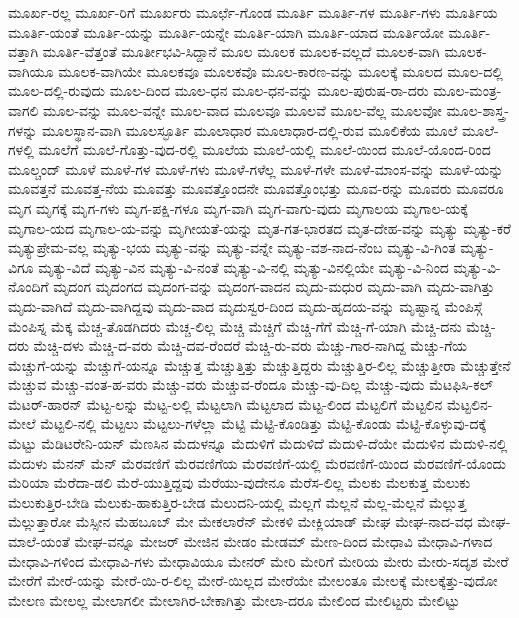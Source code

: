 {ಮೂರ್ಖ-ರಲ್ಲ
ಮೂರ್ಖ-ರಿಗೆ
ಮೂರ್ಖರು
ಮೂರ್ಛೆ-ಗೊಂಡ
ಮೂರ್ತಿ
ಮೂರ್ತಿ-ಗಳ
ಮೂರ್ತಿ-ಗಳು
ಮೂರ್ತಿಯ
ಮೂರ್ತಿ-ಯಂತೆ
ಮೂರ್ತಿ-ಯನ್ನು
ಮೂರ್ತಿ-ಯನ್ನೇ
ಮೂರ್ತಿ-ಯಾಗಿ
ಮೂರ್ತಿ-ಯಾದ
ಮೂರ್ತಿಯೋ
ಮೂರ್ತಿ-ವತ್ತಾಗಿ
ಮೂರ್ತಿ-ವೆತ್ತಂತೆ
ಮೂರ್ತೀಭವಿ-ಸಿದ್ದಾನೆ
ಮೂಲ
ಮೂಲಕ
ಮೂಲಕ-ವಲ್ಲದೆ
ಮೂಲಕ-ವಾಗಿ
ಮೂಲಕ-ವಾಗಿಯೂ
ಮೂಲಕ-ವಾಗಿಯೇ
ಮೂಲಕವೂ
ಮೂಲಕವೊ
ಮೂಲ-ಕಾರಣ-ವನ್ನು
ಮೂಲಕ್ಕೆ
ಮೂಲದ
ಮೂಲ-ದಲ್ಲಿ
ಮೂಲ-ದಲ್ಲಿ-ರುವುದು
ಮೂಲ-ದಿಂದ
ಮೂಲ-ಧನ
ಮೂಲ-ಧನ-ವನ್ನು
ಮೂಲ-ಪುರುಷ-ರಾ-ದರು
ಮೂಲ-ಮಂತ್ರ-ವಾಗಲಿ
ಮೂಲ-ವನ್ನು
ಮೂಲ-ವನ್ನೇ
ಮೂಲ-ವಾದ
ಮೂಲವೂ
ಮೂಲವೆ
ಮೂಲ-ವೆಲ್ಲ
ಮೂಲವೋ
ಮೂಲ-ಶಾಸ್ತ್ರ-ಗಳನ್ನು
ಮೂಲಸ್ಥಾನ-ವಾಗಿ
ಮೂಲಸ್ಫೂರ್ತಿ
ಮೂಲಾಧಾರ
ಮೂಲಾಧಾರ-ದಲ್ಲಿ-ರುವ
ಮೂಲಿಕೆಯ
ಮೂಲೆ
ಮೂಲೆ-ಗಳಲ್ಲಿ
ಮೂಲೆಗೆ
ಮೂಲೆ-ಗೊತ್ತು-ವುದ-ರಲ್ಲಿ
ಮೂಲೆಯ
ಮೂಲೆ-ಯಲ್ಲಿ
ಮೂಲೆ-ಯಿಂದ
ಮೂಲೆ-ಯೊಂದ-ರಿಂದ
ಮೂಲ್ಚಂದ್
ಮೂಳೆ
ಮೂಳೆ-ಗಳ
ಮೂಳೆ-ಗಳು
ಮೂಳೆ-ಗಳೆಲ್ಲ
ಮೂಳೆ-ಗಳೇ
ಮೂಳೆ-ಮಾಂಸ-ವನ್ನು
ಮೂಳೆ-ಯನ್ನು
ಮೂವತ್ತನೆ
ಮೂವತ್ತ-ನೆಯ
ಮೂವತ್ತು
ಮೂವತ್ತೊಂದನೇ
ಮೂವತ್ತೊಂಭತ್ತು
ಮೂವ-ರನ್ನು
ಮೂವರು
ಮೂವರೂ
ಮೃಗ
ಮೃಗಕ್ಕೆ
ಮೃಗ-ಗಳು
ಮೃಗ-ಪಕ್ಷಿ-ಗಳೂ
ಮೃಗ-ವಾಗಿ
ಮೃಗ-ವಾಗು-ವುದು
ಮೃಗಾಲಯ
ಮೃಗಾಲ-ಯಕ್ಕೆ
ಮೃಗಾಲ-ಯದ
ಮೃಗಾಲ-ಯ-ವನ್ನು
ಮೃಗೀಯತೆ-ಯನ್ನು
ಮೃತ-ಗತ-ಭಾರತದ
ಮೃತ-ದೇಹ-ವನ್ನು
ಮೃತ್ಯು
ಮೃತ್ಯು-ಕರೆ
ಮೃತ್ಯುಪ್ರೇಮ-ವಲ್ಲ
ಮೃತ್ಯು-ಭಯ
ಮೃತ್ಯು-ವನ್ನು
ಮೃತ್ಯು-ವನ್ನೇ
ಮೃತ್ಯು-ವಶ-ನಾದ-ನೆಂಬ
ಮೃತ್ಯು-ವಿ-ಗಿಂತ
ಮೃತ್ಯು-ವಿಗೂ
ಮೃತ್ಯು-ವಿದೆ
ಮೃತ್ಯು-ವಿನ
ಮೃತ್ಯು-ವಿ-ನಂತೆ
ಮೃತ್ಯು-ವಿ-ನಲ್ಲಿ
ಮೃತ್ಯು-ವಿನಲ್ಲಿಯೇ
ಮೃತ್ಯು-ವಿ-ನಿಂದ
ಮೃತ್ಯು-ವಿ-ನೊಂದಿಗೆ
ಮೃದಂಗ
ಮೃದಂಗದ
ಮೃದಂಗ-ವನ್ನು
ಮೃದಂಗ-ವಾದನ
ಮೃದು-ಮಧುರ
ಮೃದು-ವಾಗಿ
ಮೃದು-ವಾಗಿತ್ತು
ಮೃದು-ವಾಗಿದೆ
ಮೃದು-ವಾಗಿದ್ದವು
ಮೃದು-ವಾದ
ಮೃದುಸ್ವರ-ದಿಂದ
ಮೃದು-ಹೃದಯ-ವನ್ನು
ಮೃಷ್ಟಾನ್ನ
ಮೆಂಪಿಸ್ಗೆ
ಮೆಂಪಿಸ್ನ
ಮೆಕ್ಕ
ಮೆಚ್ಚ-ತೊಡಗಿದರು
ಮೆಚ್ಚ-ಲಿಲ್ಲ
ಮೆಚ್ಚಿ
ಮೆಚ್ಚಿಗೆ
ಮೆಚ್ಚಿ-ಗೆಗೆ
ಮೆಚ್ಚಿ-ಗೆ-ಯಾಗಿ
ಮೆಚ್ಚಿ-ದನು
ಮೆಚ್ಚಿ-ದರು
ಮೆಚ್ಚಿ-ದಳು
ಮೆಚ್ಚಿ-ದ-ವರು
ಮೆಚ್ಚಿ-ದವ-ರೆಂದರೆ
ಮೆಚ್ಚಿ-ರು-ವರು
ಮೆಚ್ಚು-ಗಾರ-ನಾಗಿದ್ದ
ಮೆಚ್ಚು-ಗೆಯ
ಮೆಚ್ಚುಗೆ-ಯನ್ನು
ಮೆಚ್ಚುಗೆ-ಯನ್ನೂ
ಮೆಚ್ಚುತ್ತ
ಮೆಚ್ಚುತ್ತಿತ್ತು
ಮೆಚ್ಚುತ್ತಿದ್ದರು
ಮೆಚ್ಚುತ್ತಿರ-ಲಿಲ್ಲ
ಮೆಚ್ಚುತ್ತೀರಾ
ಮೆಚ್ಚುತ್ತೇನೆ
ಮೆಚ್ಚುವ
ಮೆಚ್ಚು-ವಂತ-ಹ-ವರು
ಮೆಚ್ಚು-ವರು
ಮೆಚ್ಚುವ-ರೆಂದೂ
ಮೆಚ್ಚು-ವು-ದಿಲ್ಲ
ಮೆಚ್ಚು-ವುದು
ಮೆಟಫಿಸಿ-ಕಲ್
ಮೆಟರ್-ಹಾರನ್
ಮೆಟ್ಟ-ಲನ್ನು
ಮೆಟ್ಟ-ಲಲ್ಲಿ
ಮೆಟ್ಟಲಾಗಿ
ಮೆಟ್ಟಲಾದ
ಮೆಟ್ಟ-ಲಿಂದ
ಮೆಟ್ಟಲಿಗೆ
ಮೆಟ್ಟಲಿನ
ಮೆಟ್ಟಲಿನ-ಮೇಲೆ
ಮೆಟ್ಟಲಿ-ನಲ್ಲಿ
ಮೆಟ್ಟಲು
ಮೆಟ್ಟಲು-ಗಳೆಲ್ಲಾ
ಮೆಟ್ಟಿ
ಮೆಟ್ಟಿ-ಕೊಂಡಿತ್ತು
ಮೆಟ್ಟಿ-ಕೊಂಡು
ಮೆಟ್ಟಿ-ಕೊಳ್ಳುವು-ದಕ್ಕೆ
ಮೆಟ್ಟು
ಮೆಡಿಟರೇನಿ-ಯನ್
ಮೆಣಸಿನ
ಮೆದುಳನ್ನೂ
ಮೆದುಳಿಗೆ
ಮೆದುಳಿದೆ
ಮೆದುಳಿ-ದೆಯೇ
ಮೆದುಳಿನ
ಮೆದುಳಿ-ನಲ್ಲಿ
ಮೆದುಳು
ಮೆನನ್
ಮೆನ್
ಮೆರವಣಿಗೆ
ಮೆರವಣಿಗೆಯ
ಮೆರವಣಿಗೆ-ಯಲ್ಲಿ
ಮೆರವಣಿಗೆ-ಯಿಂದ
ಮೆರವಣಿಗೆ-ಯೊಂದು
ಮೆರಿಯಾ
ಮೆರೆದಾ-ಡಲಿ
ಮೆರೆ-ಯುತ್ತಿದ್ದವು
ಮೆರೆಯು-ವುದೇನೂ
ಮೆರೆಸ-ಲಿಲ್ಲ
ಮೆಲಕು
ಮೆಲಕುತ್ತ
ಮೆಲುಕು
ಮೆಲುಕುತ್ತಿರ-ಬೇಡಿ
ಮೆಲುಕು-ಹಾಕುತ್ತಿರ-ಬೇಡ
ಮೆಲುದನಿ-ಯಲ್ಲಿ
ಮೆಲ್ಲಗೆ
ಮೆಲ್ಲನೆ
ಮೆಲ್ಲ-ಮೆಲ್ಲನೆ
ಮೆಲ್ಲುತ್ತ
ಮೆಲ್ಲುತ್ತಾರೋ
ಮೆಸ್ಸೀನ
ಮೆಹಬೂಬ್
ಮೇ
ಮೇಕಲಾರೆನ್
ಮೇಕಳಿ
ಮೇಕ್ಲಿಯಾಡ್
ಮೇಘ
ಮೇಘ-ನಾದ-ವಧ
ಮೇಘ-ಮಾಲೆ-ಯಂತೆ
ಮೇಘ-ವನ್ನೂ
ಮೇಜರ್
ಮೇಜಿನ
ಮೇಡಂ
ಮೇಡಮ್
ಮೇಣ-ದಿಂದ
ಮೇಧಾವಿ
ಮೇಧಾವಿ-ಗಳಾದ
ಮೇಧಾವಿ-ಗಳಿಂದ
ಮೇಧಾವಿ-ಗಳು
ಮೇಧಾವಿಯೂ
ಮೇನರ್
ಮೇರಿ
ಮೇರಿಗೆ
ಮೇರಿಯ
ಮೇರು
ಮೇರು-ಸದೃಶ
ಮೇರೆ
ಮೇರೆಗೆ
ಮೇರೆ-ಯನ್ನು
ಮೇರೆ-ಯಿ-ರ-ಲಿಲ್ಲ
ಮೇರೆ-ಯಿಲ್ಲದ
ಮೇರೆಯೇ
ಮೇಲಂತೂ
ಮೇಲಕ್ಕೆ
ಮೇಲಕ್ಕೆತ್ತು-ವುದೋ
ಮೇಲಣ
ಮೇಲಲ್ಲ
ಮೇಲಾಗಲೀ
ಮೇಲಾಗಿರ-ಬೇಕಾಗಿತ್ತು
ಮೇಲಾ-ದರೂ
ಮೇಲಿಂದ
ಮೇಲಿಟ್ಟರು
ಮೇಲಿಟ್ಟು
}
